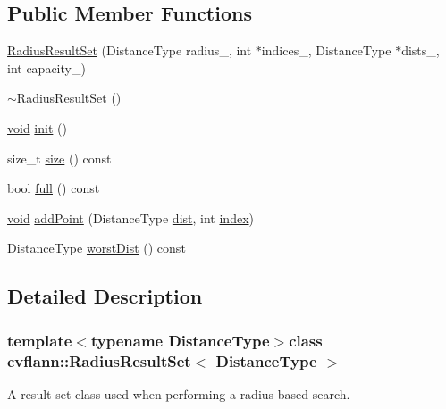 \subsection*{Public Member Functions}
\begin{DoxyCompactItemize}
\item 
\hyperlink{classcvflann_1_1RadiusResultSet_ac37216555aaf2d34ef60c63e46e4f7c2}{Radius\-Result\-Set} (Distance\-Type radius\-\_\-, int $\ast$indices\-\_\-, Distance\-Type $\ast$dists\-\_\-, int capacity\-\_\-)
\item 
\hyperlink{classcvflann_1_1RadiusResultSet_a00cd68cefd0399d50e2c47ea8b3483fd}{$\sim$\-Radius\-Result\-Set} ()
\item 
\hyperlink{legacy_8hpp_a8bb47f092d473522721002c86c13b94e}{void} \hyperlink{classcvflann_1_1RadiusResultSet_a4c967f57ce5382c8953aa4599a34377b}{init} ()
\item 
size\-\_\-t \hyperlink{classcvflann_1_1RadiusResultSet_acd1d79608ddd16add24e98a6e9df46b2}{size} () const 
\item 
bool \hyperlink{classcvflann_1_1RadiusResultSet_ab581df739566153c8c194f987054cf12}{full} () const 
\item 
\hyperlink{legacy_8hpp_a8bb47f092d473522721002c86c13b94e}{void} \hyperlink{classcvflann_1_1RadiusResultSet_a74052881e5c9d0efcae7332f7b21e4d8}{add\-Point} (Distance\-Type \hyperlink{legacy_8hpp_ae895c2003a87eda49126845b7ac3688e}{dist}, int \hyperlink{core__c_8h_a750b5d744c39a06bfb13e6eb010e35d0}{index})
\item 
Distance\-Type \hyperlink{classcvflann_1_1RadiusResultSet_a2771ae6042a1411121f1ef5494209fe8}{worst\-Dist} () const 
\end{DoxyCompactItemize}


\subsection{Detailed Description}
\subsubsection*{template$<$typename Distance\-Type$>$class cvflann\-::\-Radius\-Result\-Set$<$ Distance\-Type $>$}

A result-\/set class used when performing a radius based search. 


